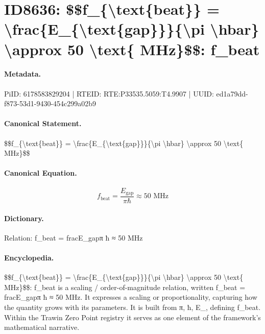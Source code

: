 \section*{ID8636: \$\$f\_\{\textbackslash{}text\{beat\}\} = \textbackslash{}frac\{E\_\{\textbackslash{}text\{gap\}\}\}\{\textbackslash{}pi \textbackslash{}hbar\} \textbackslash{}approx 50 \textbackslash{}text\{ MHz\}\$\$: f\_beat}
\paragraph{Metadata.}
PiID: 6178583829204 | RTEID: RTE:P33535.5059:T4.9907 | UUID: ed1a79dd-f873-53d1-9430-454c299a02b9

\paragraph{Canonical Statement.}
\$\$f\_\{\textbackslash{}text\{beat\}\} = \textbackslash{}frac\{E\_\{\textbackslash{}text\{gap\}\}\}\{\textbackslash{}pi \textbackslash{}hbar\} \textbackslash{}approx 50 \textbackslash{}text\{ MHz\}\$\$

\paragraph{Canonical Equation.}
\[
f_{\text{beat}} = \frac{E_{\text{gap}}}{\pi \hbar} \approx 50 \text{ MHz}
\]

\paragraph{Dictionary.}
Relation: f\_beat = fracE\_gapπ ħ ≈ 50 MHz

\paragraph{Encyclopedia.}
\$\$f\_\{\textbackslash{}text\{beat\}\} = \textbackslash{}frac\{E\_\{\textbackslash{}text\{gap\}\}\}\{\textbackslash{}pi \textbackslash{}hbar\} \textbackslash{}approx 50 \textbackslash{}text\{ MHz\}\$\$: f\_beat is a scaling / order-of-magnitude relation, written f\_beat = fracE\_gapπ ħ ≈ 50 MHz. It expresses a scaling or proportionality, capturing how the quantity grows with its parameters. It is built from π, ħ, E\_, defining f\_beat. Within the Trawin Zero Point registry it serves as one element of the framework's mathematical narrative.
